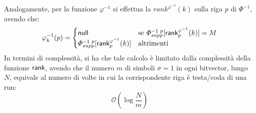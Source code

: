 Analogamente, per la funzione $\varphi^{-1}$ si effettua la
$rank^{\varphi^{-1}}(k)$ 
sulla riga $p$ di $\varPhi^{-1}$, avendo che:
\[\varphi_k^{-1}(p)=
  \begin{cases}
    \mbox{\rm {\sf null}}&\mbox{se }\varPhi^{-1\,\,p}_{supp}[\mbox{\rm {\sf rank}}^{\varphi^{-1}}_p(k)]=M\\
    \varPhi^{-1\,\,p}_{supp}[\mbox{\rm {\sf rank}}^{\varphi^{-1}}_p(k)]&\mbox{altrimenti }
  \end{cases}
\]
In termini di complessità, si ha che tale calcolo è limitato dalla complessità
della funzione $\mbox{\rm {\sf rank}}$, avendo che il numero $m$ di simboli $\sigma=1$ in ogni
bitvector, lungo $N$, equivale al numero di volte in cui la corrispondente riga
è testa/coda di una run: 
\begin{equation}
  \label{eq:queryphi}
  \mathcal{O}\left(\log\frac{N}{m}\right)
\end{equation}
